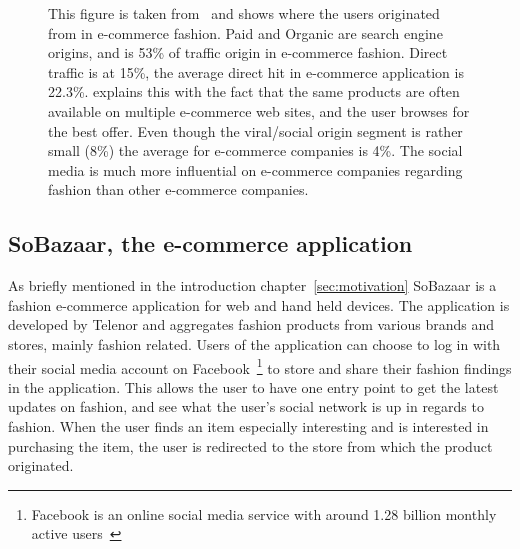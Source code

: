   \begin{figure}[H]
    \caption[Traffic Sources In Fashion]{This figure is taken from~\cite{Jorij2012} and shows where the users originated from in e-commerce fashion.
    Paid and Organic are search engine origins, and is 53\% of traffic origin in e-commerce fashion.
    Direct traffic is at 15\%, the average direct hit in e-commerce application is 22.3\%.
    \cite{Jorij2012} explains this with the fact that the same products are often available on multiple e-commerce web sites, and the user browses for the best offer.
    Even though the viral/social origin segment is rather small (8\%) the average for e-commerce companies is 4\%.
    The social media is much more influential on e-commerce companies regarding fashion than other e-commerce companies.}
  \end{figure}


\subsection{SoBazaar, the e-commerce application}
  As briefly mentioned in the introduction chapter~\ref{sec:motivation} SoBazaar is a fashion e-commerce application for web and hand held devices.
  The application is developed by Telenor and aggregates fashion products from various brands and stores, mainly fashion related.
  Users of the application can choose to log in with their social media account on Facebook~\footnote{Facebook is an online social media service with around 1.28 billion monthly active users~\cite{facebook}} to store and share their fashion findings in the application.
  This allows the user to have one entry point to get the latest updates on fashion, and see what the user's social network is up in regards to fashion.
  When the user finds an item especially interesting and is interested in purchasing the item, the user is redirected to the store from which the product originated.

